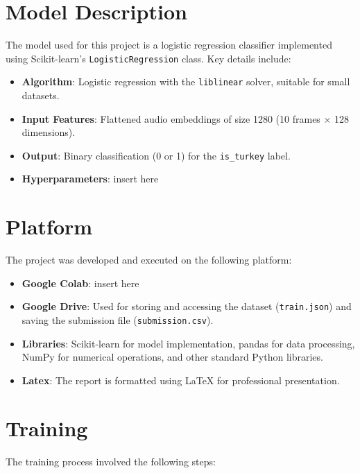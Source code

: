 \documentclass[12pt, a4paper]{article}
\begin{document}
\section{Model Description}
The model used for this project is a logistic regression classifier implemented using Scikit-learn's \texttt{LogisticRegression} class. Key details include:

\begin{itemize}
    \item \textbf{Algorithm}: Logistic regression with the \texttt{liblinear} solver, suitable for small datasets.
    \item \textbf{Input Features}: Flattened audio embeddings of size 1280 (10 frames $\times$ 128 dimensions).
    \item \textbf{Output}: Binary classification (0 or 1) for the \texttt{is\_turkey} label.
    \item \textbf{Hyperparameters}: insert here
\end{itemize}

\section{Platform}
The project was developed and executed on the following platform:

\begin{itemize}
    \item \textbf{Google Colab}: insert here
    \item \textbf{Google Drive}: Used for storing and accessing the dataset (\texttt{train.json}) and saving the submission file (\texttt{submission.csv}).
    \item \textbf{Libraries}: Scikit-learn for model implementation, pandas for data processing, NumPy for numerical operations, and other standard Python libraries.
    \item \textbf{Latex}: The report is formatted using LaTeX for professional presentation.
\end{itemize}

\section{Training}
The training process involved the following steps:
\end{document}
